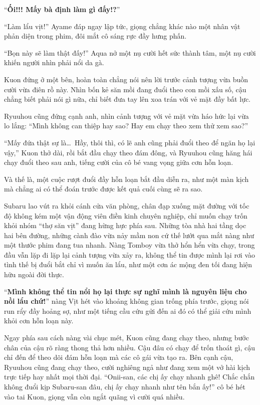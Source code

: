 \documentclass[../main.tex]{subfiles}
\begin{document}
``\textbf{Ối!!! Mấy bà định làm gì đấy!?}''

``Làm lẩu vịt!'' Ayame đáp ngay lập tức, giọng chẳng khác nào một nhân vật phản diện trong phim, đôi mắt cô sáng rực đầy hưng phấn.

``Bọn này sẽ làm thật đấy!'' Aqua nở một nụ cười hết sức thành tâm, một nụ cười khiến người nhìn phải nổi da gà.

Kuon đứng ở một bên, hoàn toàn chẳng nói nên lời trước cảnh tượng vừa buồn cười vừa điên rồ này. Nhìn bốn kẻ săn mồi đang đuổi theo con mồi xấu số, cậu chẳng biết phải nói gì nữa, chỉ biết đưa tay lên xoa trán với vẻ mặt đầy bất lực.

Ryuuhou cũng đứng cạnh anh, nhìn cảnh tượng với vẻ mặt vừa háo hức lại vừa lo lắng: ``Mình không can thiệp hay sao? Hay em chạy theo xem thử xem sao?''

``Mấy đứa thật sự là\dots\ Hầy, thôi thì, có lẽ anh cũng phải đuổi theo để ngăn họ lại vậy,'' Kuon thở dài, rồi bắt đầu chạy theo đám đông, và Ryuuhou cũng hăng hái chạy đuổi theo sau anh, tiếng cười của cô bé vang vọng giữa cơn hỗn loạn.

Và thế là, một cuộc rượt đuổi đầy hỗn loạn bắt đầu diễn ra, như một màn kịch mà chẳng ai có thể đoán trước được kết quả cuối cùng sẽ ra sao.

\ct

Subaru lao vút ra khỏi cánh cửa văn phòng, chân đạp xuống mặt đường với tốc độ không kém một vận động viên điền kinh chuyên nghiệp, chỉ muốn chạy trốn khỏi nhóm ``thợ săn vịt'' đang hừng hực phía sau. Những tòa nhà hai tầng dọc hai bên đường, những cành đào vừa nảy mầm non cứ thế lướt qua mắt nàng như một thước phim đang tua nhanh. Nàng Tomboy vừa thở hổn hển vừa chạy, trong đầu vẫn lặp đi lặp lại cảnh tượng vừa xảy ra, không thể tin được mình lại rơi vào tình thế bị đuổi bắt chỉ vì muốn ăn lẩu, như một cơn ác mộng đen tối đang hiện hữu ngoài đời thực.

``\textbf{Mình không thể tin nổi họ lại thực sự nghĩ mình là nguyên liệu cho nồi lẩu chứ!}'' nàng Vịt hét vào khoảng không gian trống phía trước, giọng nói run rẩy đầy hoảng sợ, như một tiếng cầu cứu gửi đến ai đó có thể giải cứu mình khỏi cơn hỗn loạn này.

Ngay phía sau cách nàng vài chục mét, Kuon cũng đang chạy theo, nhưng bước chân của cậu rõ ràng thong thả hơn nhiều. Cậu đâu có chạy để trốn thoát gì, cậu chỉ đến để theo dõi đám hỗn loạn mà các cô gái vừa tạo ra. Bên cạnh cậu, Ryuuhou cũng đang chạy theo, cười nghiêng ngả như đang xem một vở hài kịch trực tiếp hay nhất mọi thời đại. ``Onii-san, các chị ấy chạy nhanh ghê! Chắc chắn không đuổi kịp Subaru-san đâu, chị ấy chạy nhanh như tên bắn ấy!'' cô bé hét vào tai Kuon, giọng vẫn còn ngắt quãng vì cười quá nhiều.
\end{document}
